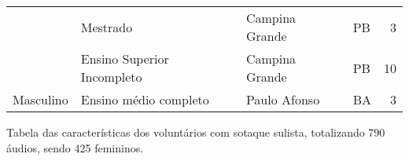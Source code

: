\begin{table}[h]
\begin{tabular}{|l|l|l|l|r|}
                             & Mestrado                                      & Campina Grande    & PB & 3                       \\ \cline{2-5} 
                             & Ensino Superior Incompleto                    & Campina Grande    & PB & 10                      \\ \cline{2-5} 
\multirow{-18}{*}{Masculino} & Ensino médio completo & Paulo Afonso      & BA & 3                       \\ \hline
\end{tabular}
\end{table}

\begin{table}[h]
\caption{Tabela das características dos voluntários com sotaque sulista, totalizando 790 áudios, sendo 425 femininos.} \label{Tabela_sulista_fem}


\end{table}
